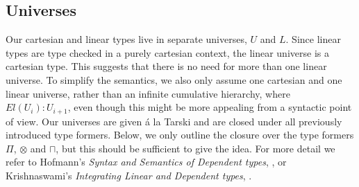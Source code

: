 \subsection{Universes}\label{universes}
Our cartesian and linear types live in separate universes, $U$ and $L$. Since linear types are type checked in a purely cartesian context, the linear universe is a cartesian type. This suggests that there is no need for more than one linear universe. 
To simplify the semantics, we also only assume one cartesian and one linear universe, rather than an infinite cumulative hierarchy, where $El(U_i) : U_{i+1}$, even though this might be more appealing from a syntactic point of view. Our universes are given á la Tarski and are closed under all previously introduced type formers. Below, we only outline the closure over the type formers $\Pi$, $\otimes$ and $\sqcap$, but this should be sufficient to give the idea. For more detail we refer to Hofmann's \textit{Syntax and Semantics of Dependent types}, \cite{hofmann1997syntax}, or Krishnaswami's \textit{Integrating Linear and Dependent types}, \cite{krishnaswami}.\\
\\
